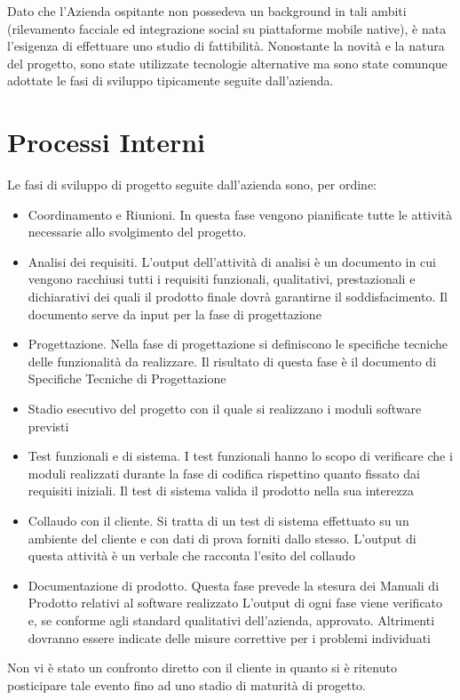 Dato che l'Azienda ospitante non possedeva un background in tali ambiti (rilevamento facciale ed integrazione social su piattaforme mobile native), è nata l'esigenza di effettuare uno studio di fattibilità. Nonostante la novità e la natura del progetto, sono state utilizzate tecnologie alternative ma sono state comunque adottate le fasi di sviluppo tipicamente seguite dall'azienda.

\section{Processi Interni}

Le fasi di sviluppo di progetto seguite dall'azienda sono, per ordine:
\begin{itemize}

\item Coordinamento e Riunioni. In questa fase vengono pianificate tutte le attività necessarie allo
svolgimento del progetto.
\item Analisi dei requisiti. L'output dell'attività di analisi è un documento in cui vengono racchiusi
tutti i requisiti funzionali, qualitativi, prestazionali e dichiarativi dei quali il prodotto finale
dovrà garantirne il soddisfacimento. Il documento serve da input per la fase di progettazione
\item Progettazione. Nella fase di progettazione si definiscono le specifiche tecniche delle funzionalità
da realizzare. Il risultato di questa fase è il documento di Specifiche Tecniche di Progettazione
\item Stadio esecutivo del progetto con il quale si realizzano i moduli software previsti
\item Test funzionali e di sistema. I test funzionali hanno lo scopo di verificare che i moduli realizzati
durante la fase di codifica rispettino quanto fissato dai requisiti iniziali. Il test di sistema valida
il prodotto nella sua interezza
\item Collaudo con il cliente. Si tratta di un test di sistema effettuato su un ambiente del cliente
e con dati di prova forniti dallo stesso. L'output di questa attività è un verbale che racconta
l'esito del collaudo
\item Documentazione di prodotto. Questa fase prevede la stesura dei Manuali di Prodotto relativi
al software realizzato
L'output di ogni fase viene verificato e, se conforme agli standard qualitativi dell'azienda, approvato.
Altrimenti dovranno essere indicate delle misure correttive per i problemi individuati
\end{itemize}

Non vi è stato un confronto diretto con il cliente in quanto si è ritenuto posticipare tale evento fino ad uno stadio di maturità di progetto.


